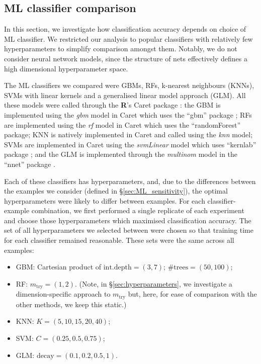 \documentclass{article}
\begin{document}
\subsection{ML classifier comparison}\label{sec:ml_model}
In this section, we investigate how classification accuracy depends on choice of ML classifier. We restricted our analysis to popular classifiers with relatively few hyperparameters to simplify comparison amongst them. Notably, we do not consider neural network models, since the structure of nets effectively defines a high dimensional hyperparameter space.

The ML classifiers we compared were GBMs, RFs, k-nearest neighbours (KNNs), SVMs with linear kernels and a generalised linear model approach (GLM). All these models were called through the \textbf{\textsf{R}}'s Caret package \citep{kuhn2008building}: the GBM is implemented using the \textit{gbm} model in Caret which uses the ``gbm'' package \citep{greenwell2019package}; RFs are implemented using the \textit{rf} model in Caret which uses the ``randomForest'' \citep{liaw2002classification} package; KNN is natively implemented in Caret and called using the \textit{knn} model; SVMs are implemented in Caret using the \textit{svmLinear} model which uses ``kernlab'' package \citep{karatzoglou2004kernlab}; and the GLM is implemented through the \textit{multinom} model in the ``nnet'' package \citep{ripley2016package}.

Each of these classifiers has hyperparameters, and, due to the differences between the examples we consider (defined in \S\ref{sec:ML_sensitivity}), the optimal hyperparameters were likely to differ between examples. For each classifier-example combination, we first performed a single replicate of each experiment and choose those hyperparameters which maximised classification accuracy. The set of all hyperparameters we selected between were chosen so that training time for each classifier remained reasonable. These sets were the same across all examples:

\begin{itemize}
	\item GBM: Cartesian product of $\text{int.depth}=(3, 7)$; $\text{\# trees} = (50, 100)$;
	\item RF: $m_{\text{try}} = (1, 2)$. (Note, in \S\ref{sec:hyperparameters}, we investigate a dimension-specific approach to $m_{\text{try}}$ but, here, for ease of comparison with the other methods, we keep this static.)
	\item KNN: $K=(5,10,15, 20,40)$;
	\item SVM: $C=(0.25, 0.5, 0.75)$;
	\item GLM: $\text{decay}=(0.1, 0.2, 0.5, 1)$.
\end{itemize}
\end{document}
